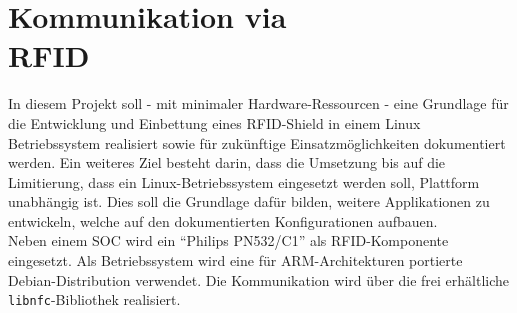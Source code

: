 \documentclass[Bachelorarbeit.tex]{subfiles}
\begin{document}
\section*{Kommunikation via \\ \ac{RFID}}
In diesem Projekt soll - mit minimaler Hardware-Ressourcen - eine Grundlage für die Entwicklung und Einbettung eines RFID-Shield in einem Linux Betriebssystem realisiert sowie für zukünftige Einsatzmöglichkeiten dokumentiert werden. 
Ein weiteres Ziel besteht darin, dass die Umsetzung bis auf die Limitierung, dass ein Linux-Betriebssystem eingesetzt werden soll, Plattform unabhängig ist. 
Dies soll die Grundlage dafür bilden, weitere Applikationen zu entwickeln, welche auf den dokumentierten Konfigurationen aufbauen. \\
Neben einem \ac{SOC} wird ein "`Philips PN532/C1"' als \ac{RFID}-Komponente eingesetzt.
Als Betriebssystem wird eine für \acs{ARM}-Architekturen portierte Debian-Distribution verwendet. 
Die Kommunikation wird über die frei erhältliche \texttt{libnfc}-Bibliothek realisiert.
\end{document}
